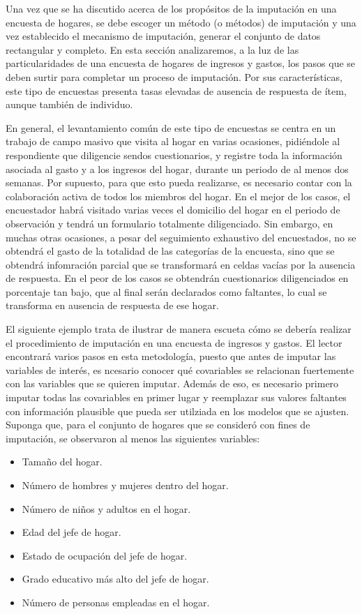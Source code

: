 Una vez que se ha discutido acerca de los propósitos de la imputación en una encuesta de hogares, se debe escoger un método (o métodos) de imputación y una vez establecido el mecanismo de imputación, generar el conjunto de datos rectangular y completo. En esta sección analizaremos, a la luz de las particularidades de una encuesta de hogares de ingresos y gastos, los pasos que se deben surtir para completar un proceso de imputación. Por sus características, este tipo de encuestas presenta tasas elevadas de ausencia de respuesta de ítem, aunque también de individuo.

En general, el levantamiento común de este tipo de encuestas se centra en un trabajo de campo masivo que visita al hogar en varias ocasiones, pidiéndole al respondiente que diligencie sendos cuestionarios, y registre toda la información asociada al gasto y a los ingresos del hogar, durante un periodo de al menos dos semanas. Por supuesto, para que esto pueda realizarse, es necesario contar con la colaboración activa de todos los miembros del hogar. En el mejor de los casos, el encuestador habrá visitado varias veces el domicilio del hogar en el periodo de observación y tendrá un formulario totalmente diligenciado. Sin embargo, en muchas otras ocasiones, a pesar del seguimiento exhaustivo del encuestados, no se obtendrá el gasto de la totalidad de las categorías de la encuesta, sino que se obtendrá infomración parcial que se transformará en celdas vacías por la ausencia de respuesta. En el peor de los casos se obtendrán cuestionarios diligenciados en porcentaje tan bajo, que al final serán declarados como faltantes, lo cual se transforma en ausencia de respuesta de ese hogar.

El siguiente ejemplo trata de ilustrar de manera escueta cómo se debería realizar el procedimiento de imputación en una encuesta de ingresos y gastos. El lector encontrará varios pasos en esta metodología, puesto que antes de imputar las variables de interés, es ncesario conocer qué covariables se relacionan fuertemente con las variables que se quieren imputar. Además de eso, es necesario primero imputar todas las covariables en primer lugar y reemplazar sus valores faltantes con información plausible que pueda ser utilziada en los modelos que se ajusten. Suponga que, para el conjunto de hogares que se consideró con fines de imputación, se observaron al menos las siguientes variables:

\begin{itemize}
\tightlist
\item
  Tamaño del hogar.
\item
  Número de hombres y mujeres dentro del hogar.
\item
  Número de niños y adultos en el hogar.
\item
  Edad del jefe de hogar.
\item
  Estado de ocupación del jefe de hogar.
\item
  Grado educativo más alto del jefe de hogar.
\item
  Número de personas empleadas en el hogar.
\end{itemize}

